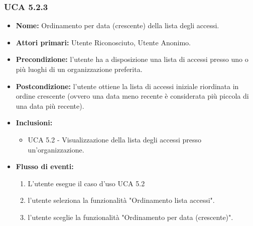 \subsubsection{UCA 5.2.3}
\begin{itemize}
    \item \textbf{Nome:} Ordinamento per data (crescente) della lista degli accessi.
    \item \textbf{Attori primari:} Utente Riconosciuto, Utente Anonimo.
    \item \textbf{Precondizione:} l’utente ha a disposizione una lista di accessi presso uno o più luoghi di un organizzazione preferita.
    \item \textbf{Postcondizione:} l’utente ottiene la lista di accessi iniziale riordinata in ordine crescente (ovvero una data meno recente è considerata più piccola di una data più recente).
    \item \textbf{Inclusioni:} %
    \begin{itemize}
        \item UCA 5.2 - Visualizzazione della lista degli accessi presso un'organizzazione.
    \end{itemize}
    \item \textbf{Flusso di eventi:}
    \begin{enumerate}
        \item L'utente esegue il caso d'uso UCA 5.2
        \item l'utente seleziona la funzionalità "Ordinamento lista accessi".
        \item l'utente sceglie la funzionalità "Ordinamento per data (crescente)".
    \end{enumerate}
\end{itemize}

